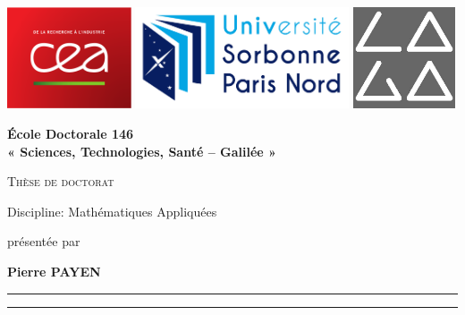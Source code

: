 \hypersetup{pageanchor=false}
\thispagestyle{empty}
\begin{titlepage}
\includegraphics[height = 3cm]{images/logo/CEA.pdf}
\hfill
\includegraphics[height = 3cm]{images/logo/USPN.jpg}
\hfill
\includegraphics[height = 3cm]{images/logo/laga.jpg}


\begin{center}
{\Large \textbf{École Doctorale 146 \\« Sciences, Technologies, Santé – Galilée »}}


{\Huge \textsc{Thèse de doctorat}}


{
    \LARGE
    Discipline: Mathématiques Appliquées
}


{
    \large
    présentée par
}

{
    \LARGE
    \textbf{Pierre PAYEN}
    \\
}

\hrule
{}
{\LARGE \textbf{\doctitlefr}}
\hrule


\end{center}
\end{titlepage}
